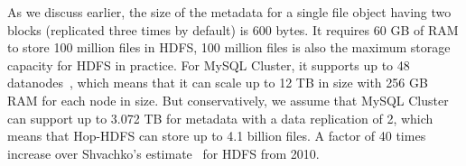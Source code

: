 \noindent As we discuss earlier, the size of the metadata for a single file object having two blocks (replicated three times by default) is 600 bytes. It requires 60 GB of RAM to store 100 million files in HDFS, 100 million files is also the maximum storage capacity for HDFS in practice. For MySQL Cluster, it supports up to 48 datanodes~\cite{mysql48nodes}, which means that it can scale up to 12 TB in size with 256 GB RAM for each node in size. But conservatively, we assume that MySQL Cluster can support up to 3.072 TB for metadata with a data replication of 2, which means that Hop-HDFS can store up to 4.1 billion files. A factor of 40 times increase over Shvachko's estimate~\cite{shvachko2010hdfs} for HDFS from 2010.


